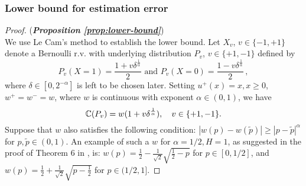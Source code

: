 \subsubsection{Lower bound for estimation error}
\label{sec:lb-proof}
\begin{proof}(\textbf{\textit{Proposition \ref{prop:lower-bound}}})\ \\
	We use Le Cam's method to establish the lower bound. 
	Let $X_v$, $v \in \{-1, +1\}$ denote a Bernoulli r.v. with underlying distribution $P_v$, $v\in\{+1,-1\}$ defined by
	\[
	P_{v} (X = 1) = \frac{1 + v\delta^{\frac{1}{\alpha}}}{2} \text{ and } P_{v} (X = 0) = \frac{1 - v\delta^{\frac{1}{\alpha}}}{2}\,,
	\]
	where $\delta\in [0,2^{-\alpha}]$ is left to be chosen later.
	Setting $u^+(x) = x, x\ge 0$, $w^+ = w^- = w$, where $w$ is \holder continuous with exponent $\alpha \in (0,1)$, 
	we have 
	$$\mathbb{C}(P_{v}) = w(1 + v\delta^{\frac{1}{\alpha}}), \quad v\in\{+1,-1\}.$$
	Suppose that $w$ also satisfies the following condition: $|w(p) - w(\tilde{p})| \geq  |p - \tilde{p}|^\alpha$ for $p,\tilde p \in (0,1)$. An example of such a $w$ for $\alpha = 1/2, H = 1$, as suggested in the proof of Theorem 6 in \cite{aditya2016weighted}, is: $w(p) = \frac{1}{2} - \frac{1}{\sqrt{2}}\sqrt{\frac{1}{2} - p}$ for $p \in [0, 1/2]$, and $w(p) = \frac{1}{2} + \frac{1}{\sqrt{2}}\sqrt{p - \frac{1}{2}}$ for $p \in (1/2, 1]$.
	

\end{proof}
